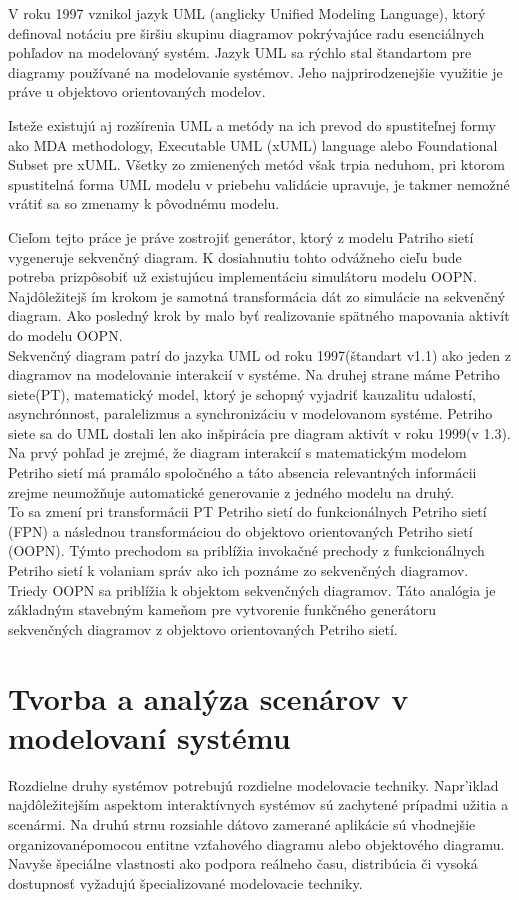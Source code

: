 V roku 1997 vznikol jazyk UML (anglicky Unified Modeling Language), ktorý definoval notáciu pre širšiu skupinu diagramov pokrývajúce radu esenciálnych pohľadov na modelovaný systém. Jazyk UML sa rýchlo stal štandartom pre diagramy používané na modelovanie systémov. Jeho najprirodzenejšie využitie je práve u objektovo orientovaných modelov.

 Isteže existujú aj rozšírenia UML a metódy na ich prevod do spustiteľnej formy ako MDA methodology, Executable UML (xUML) language alebo Foundational Subset pre xUML. Všetky zo zmienených metód však trpia neduhom, pri ktorom spustitelná forma UML modelu v priebehu validácie upravuje, je takmer nemožné vrátiť sa so zmenamy k pôvodnému modelu. 

Cieľom tejto práce je práve zostrojiť generátor, ktorý z modelu Patriho sietí vygeneruje sekvenčný diagram. K dosiahnutiu tohto odvážneho cieľu bude potreba prizpôsobiť už existujúcu implementáciu simulátoru modelu OOPN. Najdôležitejš ím  krokom je samotná transformácia dát zo simulácie na sekvenčný diagram. Ako posledný krok by malo byť realizovanie spätného mapovania aktivít do modelu OOPN. \\

Sekvenčný diagram patrí do jazyka UML od roku 1997(štandart v1.1) ako jeden z diagramov na modelovanie interakcií v systéme. Na druhej strane máme Petriho siete(PT), matematický model, ktorý je schopný vyjadriť kauzalitu udalostí, asynchrónnost, paralelizmus a synchronizáciu v modelovanom systéme. Petriho siete sa do UML dostali len ako inšpirácia pre diagram aktivít v roku 1999(v 1.3). Na prvý pohľad je zrejmé, že diagram interakcií s matematickým modelom Petriho sietí má pramálo spoločného a táto absencia relevantných informácii zrejme neumožňuje automatické generovanie z jedného modelu na druhý. \\

To sa zmení pri transformácii PT Petriho sietí do  funkcionálnych Petriho sietí (FPN) a následnou transformáciou do objektovo orientovaných Petriho sietí (OOPN). Týmto prechodom sa priblížia invokačné prechody z funkcionálnych Petriho sietí k volaniam správ ako ich poznáme zo sekvenčných diagramov. Triedy OOPN sa priblížia k objektom sekvenčných diagramov. Táto analógia je základným stavebným kameňom pre vytvorenie funkčného generátoru sekvenčných diagramov z objektovo orientovaných Petriho sietí.


\chapter{Tvorba a analýza scenárov v modelovaní systému}
 Rozdielne druhy systémov potrebujú rozdielne modelovacie techniky. Napr'iklad najdôležitejším aspektom interaktívnych systémov sú zachytené prípadmi užitia a scenármi. Na druhú strnu rozsiahle dátovo zamerané aplikácie sú vhodnejšie organizovanépomocou entitne vzťahového diagramu alebo objektového diagramu. Navyše špeciálne vlastnosti ako podpora reálneho času, distribúcia či vysoká dostupnosť vyžadujú špecializované modelovacie techniky.
 
